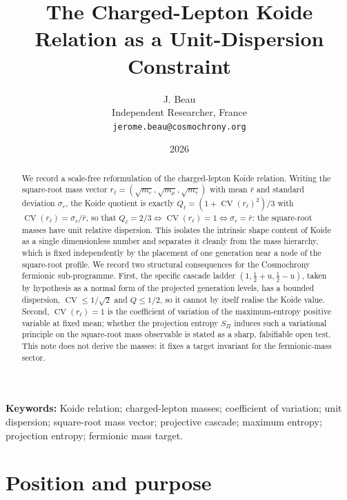 \documentclass[11pt]{article}
\title{The Charged-Lepton Koide Relation as a Unit-Dispersion Constraint}
\author{J. Beau\\
Independent Researcher, France\\
\texttt{jerome.beau@cosmochrony.org}}
\date{2026}
\theoremstyle{definition}
\theoremstyle{remark}
\newcommand{\CV}{\operatorname{CV}}
\newcommand{\rl}{r_{\ell}}
\newcommand{\SPi}{S_{\Pi}}
\begin{document}
  \maketitle

  \begin{abstract}
    We record a scale-free reformulation of the charged-lepton Koide relation.
    Writing the square-root mass vector $\rl = (\sqrt{m_e}, \sqrt{m_\mu}, \sqrt{m_\tau})$ with mean $\bar r$ and
    standard deviation $\sigma_r$, the Koide quotient is exactly
    $Q_\ell = (1 + \CV(\rl)^2)/3$ with $\CV(\rl) = \sigma_r/\bar r$, so that
    $Q_\ell = 2/3 \iff \CV(\rl) = 1 \iff \sigma_r = \bar r$: the square-root masses have unit relative dispersion.
    This isolates the intrinsic shape content of Koide as a single dimensionless number and separates it cleanly
    from the mass hierarchy, which is fixed independently by the placement of one generation near a node of the
    square-root profile.
    We record two structural consequences for the Cosmochrony fermionic sub-programme.
    First, the specific cascade ladder $(1, \tfrac12 + u, \tfrac12 - u)$, taken by hypothesis as a normal form of the
    projected generation levels, has a bounded dispersion, $\CV \le 1/\sqrt2$ and $Q \le 1/2$, so it cannot by itself realise the Koide
    value.
    Second, $\CV(\rl) = 1$ is the coefficient of variation of the maximum-entropy positive variable at fixed mean;
    whether the projection entropy $\SPi$ induces such a variational principle on the square-root mass observable
    is stated as a sharp, falsifiable open test.
    This note does not derive the masses: it fixes a target invariant for the fermionic-mass sector.
  \end{abstract}

  \noindent\textbf{Keywords:}
  Koide relation; charged-lepton masses; coefficient of variation; unit dispersion; square-root mass vector;
  projective cascade; maximum entropy; projection entropy; fermionic mass target.

  \newpage

  \tableofcontents

  \newpage

  \section{Position and purpose}
    \label{sec:position}
\end{document}
